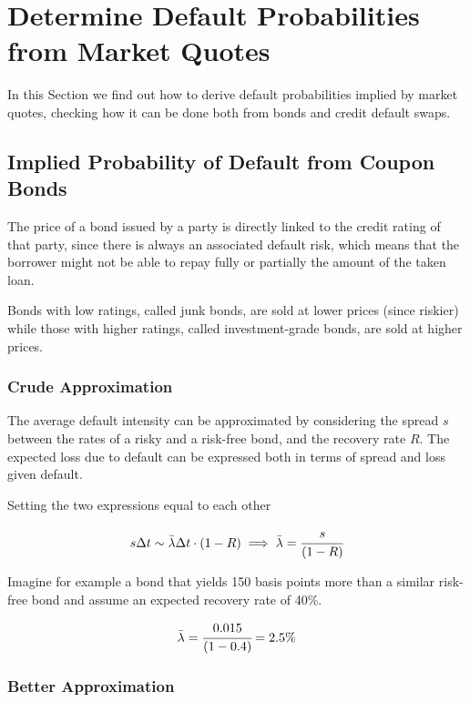 \section{Determine Default Probabilities from Market Quotes}
In this Section we find out how to derive default probabilities implied by market quotes, checking how it can be done both from bonds and credit default swaps.

\subsection{Implied Probability of Default from Coupon Bonds}\label{default-probabilities-and-bond-prices}

The price of a bond issued by a party is directly linked to the credit rating of that party, since there is always an associated default risk, which means that the borrower might not be able to repay fully or partially the amount of the taken loan. 

Bonds with low ratings, called junk bonds, are sold at lower prices (since riskier) while those with higher ratings, called investment-grade bonds, are sold at higher prices.

\subsubsection{Crude Approximation}

The average default intensity can be approximated by considering the spread $s$ between the rates of a risky and a risk-free bond, and the recovery rate $R$.
The expected loss due to default can be expressed both in terms of spread and loss given default. 

Setting the two expressions equal to each other

\begin{equation}
s \Delta t \sim \bar{\lambda}\Delta t\cdot(1-R) \implies \bar{\lambda} = \cfrac{s}{(1-R)}
\end{equation}

Imagine for example a bond that yields 150 basis points more than a similar risk-free bond and assume an expected recovery rate of 40\%.

\begin{equation*}
\bar{\lambda} = \cfrac{0.015}{(1-0.4)} = 2.5\%
\end{equation*}

\subsubsection{Better Approximation}

